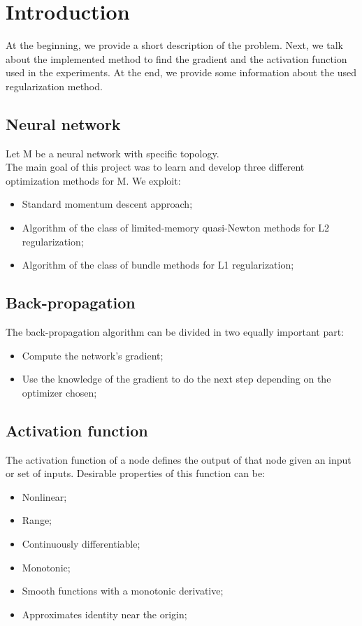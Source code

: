 \section{Introduction}
At the beginning, we provide a short description of the problem. Next, we talk about the implemented method to find the gradient and the activation function used in the experiments. At the end, we provide some information about the used regularization method.
\subsection{Neural network}
Let M be a neural network with specific topology.
\\
The main goal of this project was to learn and develop three different optimization methods for M.
We exploit:
\begin{itemize}
	\item Standard momentum descent approach;
	\item Algorithm of the class of limited-memory quasi-Newton methods for L2 regularization;
	\item Algorithm of the class of bundle methods for L1 regularization;
\end{itemize}
\subsection{Back-propagation}
The back-propagation algorithm can be divided in two equally important part:
\begin{itemize}
	\item Compute the network's gradient;
	\item Use the knowledge of the gradient to do the next step depending on the optimizer chosen;
\end{itemize}
\subsection{Activation function}
\label{activationFunction}
The activation function of a node defines the output of that node given an input or set of inputs. 
Desirable properties of this function can be:
\begin{itemize}
	\item Nonlinear;
	\item Range;
	\item Continuously differentiable;
	\item Monotonic;
	\item Smooth functions with a monotonic derivative;
	\item Approximates identity near the origin;
\end{itemize}

